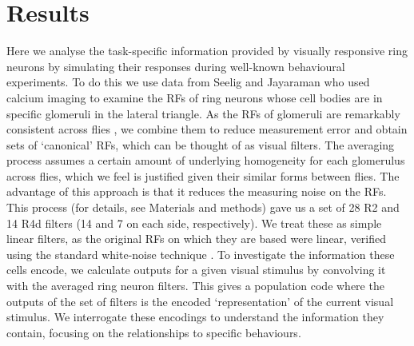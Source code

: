 \section*{Results}
Here we analyse the task-specific information provided by visually responsive ring neurons by simulating their responses during well-known behavioural experiments. To do this we use data from Seelig and Jayaraman \cite{Seelig2013} who used calcium imaging to examine the \acp{RF} of ring neurons whose cell bodies are in specific glomeruli in the lateral triangle. As the \acp{RF} of glomeruli are remarkably consistent across flies \cite{Seelig2013}, we combine them to reduce measurement error and obtain sets of ‘canonical’ \acp{RF}, which can be thought of as visual filters.
The averaging process assumes a certain amount of underlying homogeneity for each glomerulus across flies, which we feel is justified given their similar forms between flies.
The advantage of this approach is that it reduces the measuring noise on the RFs.
This process (for details, see Materials and methods) gave us a set of 28 R2 and 14 R4d filters (14 and 7 on each side, respectively).
We treat these as simple linear filters, as the original RFs on which they are based were linear, verified using the standard white-noise technique \cite{Seelig2013}.
To investigate the information these cells encode, we calculate outputs for a given visual stimulus by convolving it with the averaged ring neuron filters. This gives a population code where the outputs of the set of filters is the encoded ‘representation’ of the current visual stimulus. We interrogate these encodings to understand the information they contain, focusing on the relationships to specific behaviours.

